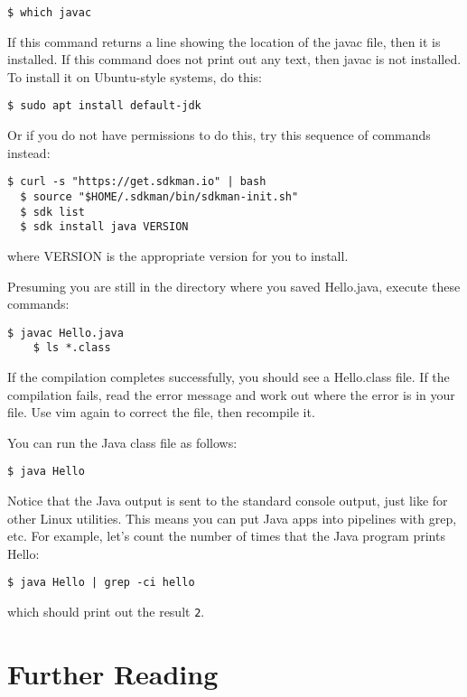 \documentclass{article}
\begin{document}
\begin{lstlisting}[style=BashInputStyle]
    $ which javac
\end{lstlisting}

If this command returns a line showing the location of the javac file, then it is installed. If this command does not print out any text, then javac is not installed. To install it on Ubuntu-style systems, do this:

\begin{lstlisting}[style=BashInputStyle]
    $ sudo apt install default-jdk
\end{lstlisting}

Or if you do not have permissions to do this, try this sequence of commands instead:
\begin{lstlisting}[style=BashInputStyle]
  $ curl -s "https://get.sdkman.io" | bash
  $ source "$HOME/.sdkman/bin/sdkman-init.sh"
  $ sdk list
  $ sdk install java VERSION
\end{lstlisting}

where VERSION is the appropriate version for you to install.


Presuming you are still in the directory where you saved Hello.java, execute these commands:

\begin{lstlisting}[style=BashInputStyle]
    $ javac Hello.java
    $ ls *.class
\end{lstlisting}

If the compilation completes successfully, you should see a Hello.class file. If the compilation fails, read the error message and work out where the error is in your file. Use vim again to correct the file, then recompile it.

You can run the Java class file as follows:
\begin{lstlisting}[style=BashInputStyle]
    $ java Hello
\end{lstlisting}

Notice that the Java output is sent to the standard console output, just like for other Linux utilities. This means you can put Java apps into pipelines with grep, etc. For example, let's count the number of times that the Java program prints Hello:
\begin{lstlisting}[style=BashInputStyle]
    $ java Hello | grep -ci hello
\end{lstlisting}

which should print out the result \texttt{2}.

\section*{Further Reading}
\end{document}

